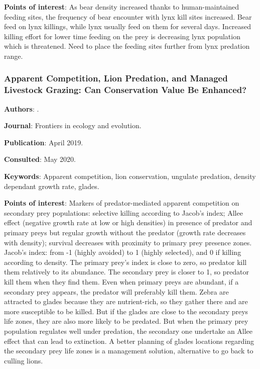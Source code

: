 \documentclass[12pt,a4paper]{article}
\begin{document}
\textbf{Points of interest}: As bear density increased thanks to human-maintained feeding sites, the frequency of bear encounter with lynx kill sites increased. Bear feed on lynx killings, while lynx usually feed on them for several days. Increased killing effort for lower time feeding on the prey is decreasing lynx population which is threatened. Need to place the feeding sites further from lynx predation range.

\newpage

\subsubsection*{Apparent Competition, Lion Predation, and Managed Livestock Grazing: Can Conservation Value Be Enhanced?}

\textbf{Authors}: \cite{ngweno2019apparent}.

\textbf{Journal}: Frontiers in ecology and evolution.

\textbf{Publication}: April 2019.

\textbf{Consulted}: May 2020.

\textbf{Keywords}: Apparent competition, lion conservation, ungulate predation, density dependant growth rate, glades.

\textbf{Points of interest}:
Markers of predator-mediated apparent competition on secondary prey populations: selective killing according to Jacob's index; Allee effect (negative growth rate at low or high densities) in presence of predator and primary preys but regular growth without the predator (growth rate decreases with density); survival decreases with proximity to primary prey presence zones.
Jacob's index: from -1 (highly avoided) to 1 (highly selected), and 0 if killing according to density.
The primary prey's index is close to zero, so predator kill them relatively to its abundance. The secondary prey is closer to 1, so predator kill them when they find them. Even when primary preys are abundant, if a secondary prey appears, the predator will preferably kill them.
Zebra are attracted to glades because they are nutrient-rich, so they gather there and are more susceptible to be killed. But if the glades are close to the secondary preys life zones, they are also more likely to be predated. But when the primary prey population regulates well under predation, the secondary one undertake an Allee effect that can lead to extinction.
A better planning of glades locations regarding the secondary prey life zones is a management solution, alternative to go back to culling lions.
\end{document}
